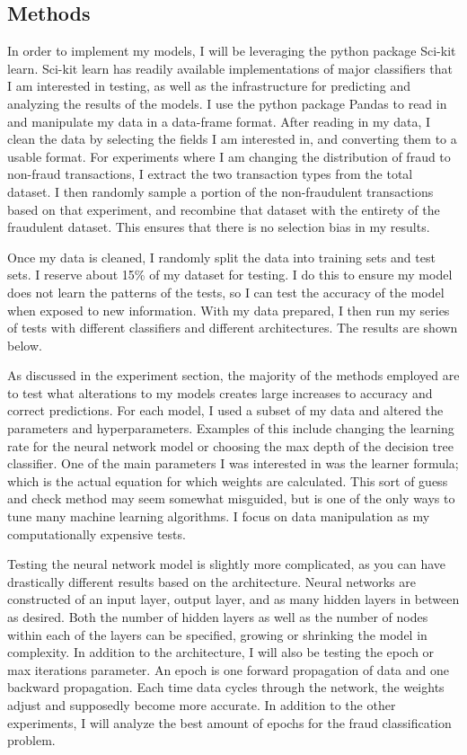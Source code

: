 \documentclass[midd]{thesis}
\begin{document}
\subsection{Methods}

In order to implement my models, I will be leveraging the python package Sci-kit learn. Sci-kit learn has readily available implementations of major classifiers that I am interested in testing, as well as the infrastructure for predicting and analyzing the results of the models. I use the python package Pandas to read in and manipulate my data in a data-frame format. After reading in my data, I clean the data by selecting the fields I am interested in, and converting them to a usable format. For experiments where I am changing the distribution of fraud to non-fraud transactions, I extract the two transaction types from the total dataset. I then randomly sample a portion of the non-fraudulent transactions based on that experiment, and recombine that dataset with the entirety of the fraudulent dataset. This ensures that there is no selection bias in my results. 

Once my data is cleaned, I randomly split the data into training sets and test sets. I reserve about 15\% of my dataset for testing. I do this to ensure my model does not learn the patterns of the tests, so I can test the accuracy of the model when exposed to new information. With my data prepared, I then run my series of tests with different classifiers and different architectures. The results are shown below. 

As discussed in the experiment section, the majority of the methods employed are to test what alterations to my models creates large increases to accuracy and correct predictions. For each model, I used a subset of my data and altered the parameters and hyperparameters. Examples of this include changing the learning rate for the neural network model or choosing the max depth of the decision tree classifier. One of the main parameters I was interested in was the learner formula; which is the actual equation for which weights are calculated. This sort of guess and check method may seem somewhat misguided, but is one of the only ways to tune many machine learning algorithms. I focus on data manipulation as my computationally expensive tests. 



Testing the neural network model is slightly more complicated, as you can have drastically different results based on the architecture. Neural networks are constructed of an input layer, output layer, and as many hidden layers in between as desired. Both the number of hidden layers as well as the number of nodes within each of the layers can be specified, growing or shrinking the model in complexity. In addition to the architecture, I will also be testing the epoch or max iterations parameter. An epoch is one forward propagation of data and one backward propagation. Each time data cycles through the network, the weights adjust and supposedly become more accurate. In addition to the other experiments, I will analyze the best amount of epochs for the fraud classification problem.
\end{document}
